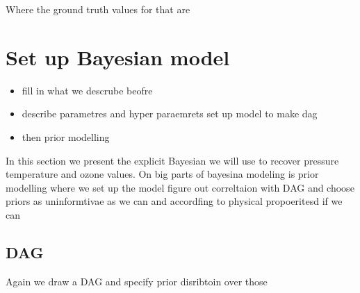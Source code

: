 Where the ground truth values for that are 

\section{Set up Bayesian model}
\begin{itemize}
	\item fill in what we descrube beofre 
	\item describe parametres and hyper paraemrets set up model to make dag
	\item then prior modelling
\end{itemize}
In this section we present the explicit Bayesian we will use to recover pressure temperature and ozone values.
On big parts of bayesina modeling is prior modelling where we set up the model
figure out correltaion with DAG
and choose priors as uninformtivae as we can 
and accordfing to physical propoeritesd if we can 
\subsection{DAG}
Again we draw a DAG and specify prior disribtoin over those

